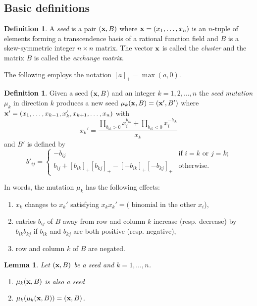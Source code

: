 \documentclass{amsart}
\newtheorem{lemma}[theorem]{Lemma}
\theoremstyle{definition}
\newtheorem{definition}[theorem]{Definition}
\theoremstyle{remark}
\numberwithin{equation}{section}
\newcommand{\x}{{\bf x}}
\begin{document}
	\subsection{Basic definitions}

	\begin{definition}
		A \emph{seed} is a pair $(\x,B)$ where $\x = (x_1,\ldots, x_n)$ is an $n$-tuple of elements forming a transcendence basis of a rational function field and $B$ is a skew-symmetric integer $n \times n$ matrix.  The vector $\x$ is called the \emph{cluster} and the matrix $B$ is called the \emph{exchange matrix}.
	\end{definition}
  
	The following employs the notation $[a]_+ = \max(a,0)$.
	\begin{definition}
		Given a seed ($\x,B$) and an integer $k=1,2,\ldots, n$ the \emph{seed mutation} $\mu_k$ in direction $k$ produces a new seed $\mu_k(\x,B) = (\x',B')$ where $\x' = (x_1,\ldots, x_{k-1}, x_k', x_{k+1},\ldots, x_n)$ with 
		\begin{equation} \label{eq:exchange relation}
		x_k' = \frac{\prod_{b_{ik}>0} x_i^{b_{ik}} + \prod_{b_{ik}<0} x_i^{-b_{ik}}}{x_k}
		\end{equation}
		and $B'$ is defined by
		\begin{equation}\label{eq:matrix mutation}
      b'_{ij}=\begin{cases}
                 -b_{ij} & \text{if $i=k$ or $j=k$;}\\
                 b_{ij}+[b_{ik}]_+[b_{kj}]_+-[-b_{ik}]_+[-b_{kj}]_+ & \text{otherwise.}
               \end{cases}
    \end{equation}
	\end{definition}
		
	In words, the mutation $\mu_k$ has the following effects:
	\begin{enumerate}
	\item $x_k$ changes to $x_k'$ satisfying $x_kx_k' = (\textrm{ binomial in the other } x_i$),
	\item entries $b_{ij}$ of $B$ away from row and column $k$ increase (resp. decrease) by $b_{ik}b_{kj}$ if $b_{ik}$ and $b_{kj}$ are both positive (resp. negative),
	\item row and column $k$ of $B$ are negated.
	\end{enumerate}
	
	\begin{lemma} \label{lem:mutate}
	Let $(\x,B)$ be a seed and $k=1,\ldots, n$.
	\begin{enumerate}
		\item $\mu_k(\x,B)$ is also a seed
		\item $\mu_k(\mu_k(\x,B)) = (\x,B)$.
	\end{enumerate}
	\end{lemma}
	
\end{document}
